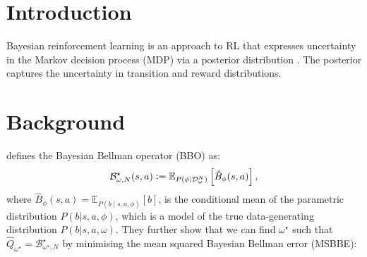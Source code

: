 \documentclass[]{uai2021} %
\title{}
\author[1]{\href{mailto:<jj@example.edu>?Subject=LALAL}{Author}{}}
\newcommand{\defeq}{\vcentcolon=}
\newcommand{\E}{\mathbb{E}}
\newcommand{\D}{\mathcal{D}}
\newcommand{\B}{\mathcal{B}}
\begin{document}
\maketitle

\begin{abstract}
\end{abstract}

\section{Introduction}
Bayesian reinforcement learning is an approach to RL that expresses uncertainty in the
Markov decision process (MDP) via a posterior distribution \citep{ghavamzadeh_bayesian_2015}.
The posterior captures the uncertainty in transition and reward distributions.

\section{Background}
\citet{fellows_bayesian_2021} defines the Bayesian Bellman operator (BBO) as:
\begin{equation}
    \B_{\omega, N}^\star(s,a) \defeq \E_{P(\phi \vert \D_\omega^N)} \left[ \hat{B}_\phi(s,a) \right],
\end{equation}
where \(\hat{B}_\phi(s,a) = \E_{P(b \mid s, a, \phi)}[b]\), is the conditional mean of the
parametric distribution \(P(b \vert s, a, \phi)\), which is a model of the true
data-generating distribution \(P(b \vert s, a, \omega)\). They further show that we can
find \(\omega^\star\) such that \(\hat{Q}_{\omega^\star} = \B^\star_{\omega^\star, N}\)
by minimising the mean squared Bayesian Bellman error (MSBBE):
\end{document}
